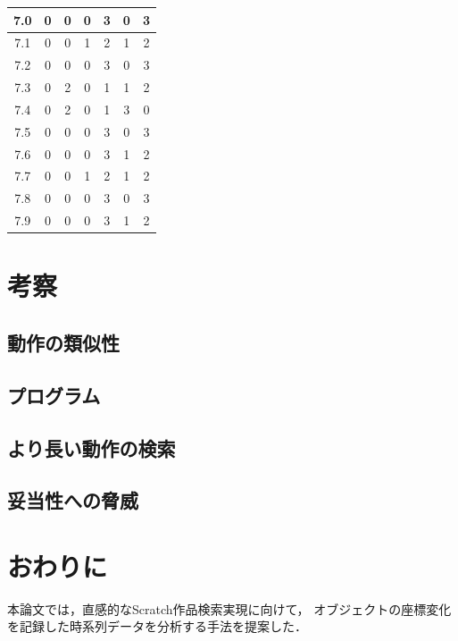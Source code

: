 \documentclass[11pt]{jreport}
\begin{document}
\begin{table}
{\begin{tabular}{c|c|c|c|c|c|c}
    \hline
    7.0 & 0 & 0 & 0 & 3 & 0 & 3 \\
    \hline
    7.1 & 0 & 0 & 1 & 2 & 1 & 2 \\
    \hline
    7.2 & 0 & 0 & 0 & 3 & 0 & 3 \\
    \hline
    7.3 & 0 & 2 & 0 & 1 & 1 & 2 \\
    \hline
    7.4 & 0 & 2 & 0 & 1 & 3 & 0 \\
    \hline
    7.5 & 0 & 0 & 0 & 3 & 0 & 3 \\
    \hline
    7.6 & 0 & 0 & 0 & 3 & 1 & 2 \\
    \hline
    7.7 & 0 & 0 & 1 & 2 & 1 & 2 \\
    \hline
    7.8 & 0 & 0 & 0 & 3 & 0 & 3 \\
    \hline
    7.9 & 0 & 0 & 0 & 3 & 1 & 2 \\
    \hline
    \end{tabular}
    }
\end{table}       

\chapter{考察}

\section{動作の類似性}

\section{プログラム}


\section{より長い動作の検索}

\section{妥当性への脅威}

\chapter{おわりに}
本論文では，直感的なScratch作品検索実現に向けて，
オブジェクトの座標変化を記録した時系列データを分析する手法を提案した．


\end{document}

